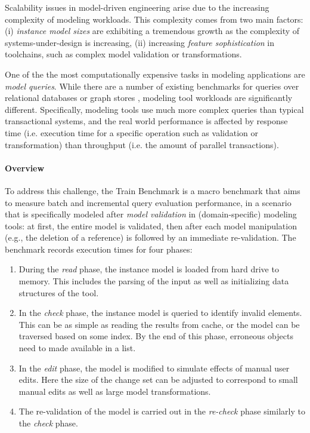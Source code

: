 Scalability issues in model-driven engineering arise due to the increasing
complexity of modeling workloads. This complexity comes from two main factors:
(i) \emph{instance model sizes} are exhibiting a tremendous growth as the
complexity of systems-under-design is increasing, (ii) increasing \emph{feature
sophistication} in toolchains, such as complex model validation or
transformations.

One of the the most computationally expensive tasks in modeling applications are
\emph{model queries}. While there are a number of existing benchmarks for
queries over relational databases \cite{tpc-c} or graph stores
\cite{BerlinBenchmark, SP2Bench}, modeling tool workloads are significantly
different. Specifically, modeling tools use much more complex queries than
typical transactional systems, and the real world performance is affected by
response time (i.e. execution time for a specific operation such as validation
or transformation) than throughput (i.e. the amount of parallel transactions).


\paragraph{Overview}
To address this challenge, the Train Benchmark \cite{TB:SCP2013,TBwebsite} is a macro
benchmark that aims to measure batch and incremental query evaluation
performance, in a scenario that is specifically modeled after \emph{model
validation} in (domain-specific) modeling tools: at first, the entire model is
validated, then after each model manipulation (e.g., the deletion of a
reference) is followed by an immediate re-validation. The benchmark records
execution times for four phases:

\begin{enumerate}
 \item During the \emph{read} phase, the instance model
 is loaded from hard drive to memory. This includes the parsing of the input as
 well as initializing data structures of the tool. 
 
 \item In the \emph{check} phase, the instance model is queried to identify
 invalid elements. This can be as simple as reading the results from cache, or
 the model can be traversed based on some index. By the end of this phase,
 erroneous objects need to made available in a list.
 
 \item In the \emph{edit} phase, the model is modified to simulate effects of
 manual user edits. Here the size of the change set can be adjusted to
 correspond to small manual edits as well as large model transformations.
 
 \item The re-validation of the model is carried out in the \emph{re-check}
 phase similarly to the \emph{check} phase.
\end{enumerate}

